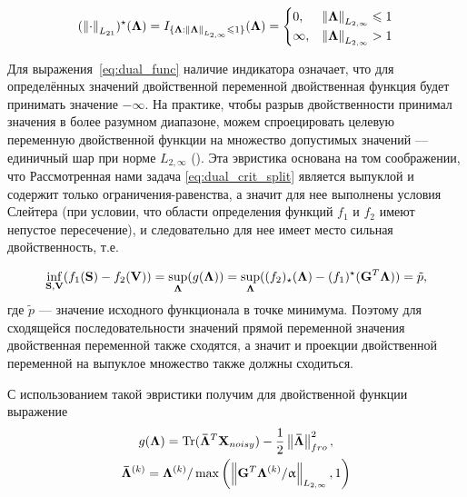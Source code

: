 \begin{equation}
    (\left\lVert\cdot\right\rVert_{L_{21}})^{\star}(\mathbf{\Lambda}) = I_{\{\mathbf{\Lambda} : \left\lVert\mathbf{\Lambda}\right\rVert_{L_{2,\infty}} \leqslant 1\}}(\mathbf{\Lambda})=
    \begin{cases}
        0, & \left\lVert\mathbf{\Lambda}\right\rVert_{L_{2,\infty}} \leqslant 1\\
        \infty, & \left\lVert\mathbf{\Lambda}\right\rVert_{L_{2,\infty}} > 1
    \end{cases}
\end{equation}

Для выражения~\ref{eq:dual_func} наличие индикатора означает, что для
определённых значений двойственной переменной двойственная функция будет
принимать значение $-\infty$.
На практике, чтобы разрыв двойственности
принимал значения в более разумном диапазоне, можем спроецировать целевую переменную
двойственной функции на множество допустимых значений --- единичный шар при
норме $L_{2,\infty}$ (\cite{gramfort_2012, gramfort_2014}).
Эта эвристика основана на том соображении, что
Рассмотренная нами задача \ref{eq:dual_crit_split} является выпуклой и содержит только
ограничения-равенства, а значит для нее выполнены условия Слейтера (при
условии, что области определения функций $f_1$ и $f_2$ имеют непустое
пересечение), и следовательно для нее имеет место сильная двойственность,
т.е. 

\begin{equation}
    \inf_{\mathbf{S}, \mathbf{V}}(f_1(\mathbf{S}) - f_2(\mathbf{V})) = \sup_{\mathbf{\Lambda}}(g(\mathbf{\Lambda})) =
    \sup_{\mathbf{\Lambda}}((f_2)_{\star}(\mathbf{\Lambda}) - (f_1)^{\star}(\mathbf{G}^T\mathbf{\Lambda})) = \tilde{p},
\end{equation}
где $\tilde{p}$ --- значение исходного функционала в точке минимума.
Поэтому для сходящейся последовательности
значений прямой переменной значения двойственная переменной также сходятся,
а значит и проекции двойственной переменной на выпуклое множество также должны сходиться.

С использованием такой эвристики получим для двойственной функции выражение
\begin{gather}
    g(\mathbf{\Lambda}) =
    \operatorname*{Tr}(\mathbf{\bar{\Lambda}}^T\mathbf{X}_{noisy}) - \frac{1}{2}\left\lVert\mathbf{\bar{\Lambda}}\right\rVert^2_{fro},\\
    \mathbf{\bar{\Lambda}}^{(k)} = \mathbf{\Lambda}^{(k)} / \max\left(\left\lVert\mathbf{G}^T\mathbf{\Lambda}^{(k)}/\upalpha\right\rVert_{L_{2,\infty}}, 1\right)
    \label{eq:projection_of_dual_var}
\end{gather}

